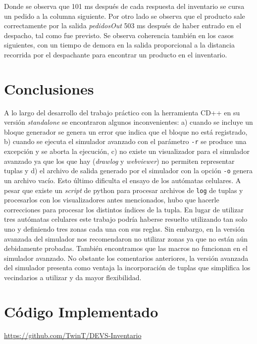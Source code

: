 \documentclass[10pt]{article}
\begin{document}
Donde se observa que 101 ms después de cada respuesta del inventario se cursa un pedido a la columna siguiente. Por otro lado se observa que el producto sale correctamente por la salida \textit{pedidosOut} 503 ms después de haber entrado en el despacho, tal como fue previsto. Se observa coherencia también en los casos siguientes, con un tiempo de demora en la salida proporcional a la distancia recorrida por el despachante para encontrar un producto en el inventario.




\section{Conclusiones}

A lo largo del desarrollo del trabajo práctico con la herramienta CD++ en su versión \textit{standalone} se encontraron algunos inconvenientes: a) cuando se incluye un bloque generador se genera un error que indica que el bloque no está registrado, b) cuando se ejecuta el simulador avanzado con el parámetro \texttt{-r} se produce una excepción y se aborta la ejecución, c) no existe un visualizador para el simulador avanzado ya que los que hay (\textit{drawlog} y \textit{webviewer}) no permiten representar tuplas y d) el archivo de salida generado por el simulador con la opción \texttt{-o} genera un archivo vacío. Esto último dificulta el ensayo de los autómatas celulares. A pesar que existe un \textit{script} de python para procesar archivos de \texttt{log} de tuplas y procesarlos con los visualizadores antes mencionados, hubo que hacerle correcciones para procesar los distintos índices de la tupla. En lugar de utilizar tres autómatas celulares este trabajo podría haberse resuelto utilizando tan solo uno y definiendo tres zonas cada una con sus reglas. Sin embargo, en la versión avanzada del simulador nos recomendaron no utilizar zonas ya que no están aún debidamente probadas. También encontramos que las macros no funcionan en el simulador avanzado. No obstante los comentarios anteriores, la versión avanzada del simulador presenta como ventaja la incorporación de tuplas que simplifica los vecindarios a utilizar y da mayor flexibilidad.


\appendix
\section{Código Implementado}

\url{https://github.com/TwinT/DEVS-Inventario}



\end{document}
